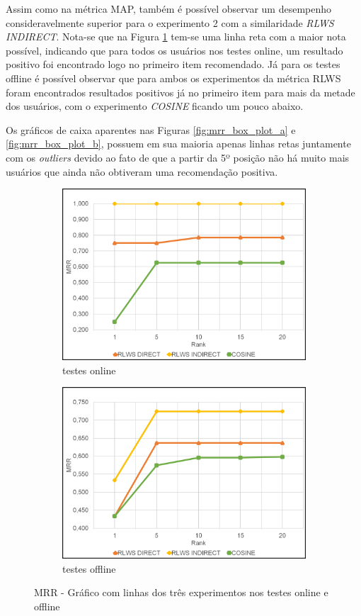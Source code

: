 Assim como na métrica \ac{MAP}, também é possível observar um desempenho consideravelmente superior para o experimento 2 com a similaridade \textit{RLWS INDIRECT}. Nota-se que na Figura \ref{fig:mrr_line_a} tem-se uma linha reta com a maior nota possível, indicando que para todos os usuários nos testes online, um resultado positivo foi encontrado logo no primeiro item recomendado. Já para os testes offline é possível observar que para ambos os experimentos da métrica \ac{RLWS} foram encontrados resultados positivos já no primeiro item para mais da metade dos usuários, com o experimento \textit{COSINE} ficando um pouco abaixo. 

Os gráficos de caixa aparentes nas Figuras \ref{fig:mrr_box_plot_a} e \ref{fig:mrr_box_plot_b}, possuem em sua maioria apenas linhas retas juntamente com os \textit{outliers} devido ao fato de que a partir da 5º posição não há muito mais usuários que ainda não obtiveram uma recomendação positiva.

\begin{figure}
    \begin{subfigure}{.5\textwidth}
        \centering
        \includegraphics[width=.8\linewidth]{imagens/mrr_results_online.jpg}
        \caption{testes online}
        \label{fig:mrr_line_a}
    \end{subfigure}%
    \begin{subfigure}{.5\textwidth}
        \centering
        \includegraphics[width=.8\linewidth]{imagens/mrr_results_offline.jpg}
        \caption{testes offline}
        \label{fig:mrr_line_b}
    \end{subfigure}
    \caption{MRR - Gráfico com linhas dos três experimentos nos testes online e offline}
    \label{fig:mrr_line}
\end{figure}

